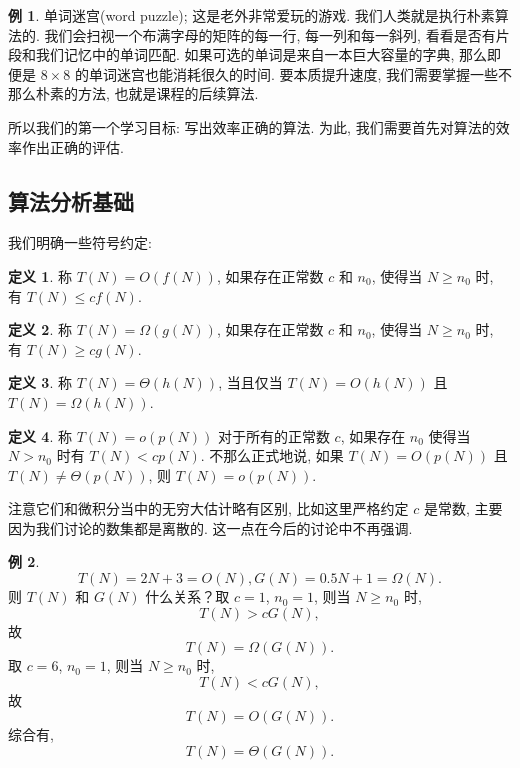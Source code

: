 \documentclass[a4paper]{ctexart}
\theoremstyle{definition}
\newtheorem{definition}{定义}[section]
\theoremstyle{definition}
\newtheorem{example}{例}[section]
\begin{document}
\begin{example}
单词迷宫(word puzzle); 这是老外非常爱玩的游戏. 我们人类就是执行朴素算法的.
我们会扫视一个布满字母的矩阵的每一行, 每一列和每一斜列, 看看是否有片段和我们记忆中的单词匹配.
如果可选的单词是来自一本巨大容量的字典, 那么即便是 $8 \times 8$ 的单词迷宫也能消耗很久的时间.
要本质提升速度, 我们需要掌握一些不那么朴素的方法, 也就是课程的后续算法.
\end{example}

所以我们的第一个学习目标: 写出效率正确的算法. 为此, 我们需要首先对算法的效率作出正确的评估. 

\subsection{算法分析基础}

我们明确一些符号约定:

\begin{definition}
  称 $T(N) = O(f(N))$, 如果存在正常数 $c$ 和 $n_0$,
  使得当 $N \geq n_0$ 时, 有 $T(N) \leq cf(N)$.
\end{definition}

\begin{definition}
  称 $T(N) = \Omega(g(N))$, 如果存在正常数 $c$ 和 $n_0$,
  使得当 $N \geq n_0$ 时, 有 $T(N) \geq cg(N)$.  
\end{definition}

\begin{definition}
称 $T(N) = \Theta(h(N))$, 当且仅当 $T(N) = O(h(N))$ 且 $T(N) = \Omega(h(N))$.  
\end{definition}

\begin{definition}
  称 $T(N) = o(p(N))$ 对于所有的正常数 $c$,
  如果存在 $n_0$ 使得当 $N > n_0$ 时有 $T(N) < cp(N)$.
  不那么正式地说, 如果 $T(N) = O(p(N))$ 且 $T(N) \neq \Theta(p(N))$,
  则 $T(N) = o(p(N))$.
\end{definition}

注意它们和微积分当中的无穷大估计略有区别, 比如这里严格约定 $c$ 是常数,
主要因为我们讨论的数集都是离散的. 这一点在今后的讨论中不再强调.

\begin{example}
  \[
  T(N) = 2N + 3 = O(N),
  G(N) = 0.5N + 1 = \Omega(N).
  \]
  则 $T(N)$ 和 $G(N)$ 什么关系？取 $c = 1$, $n_0 = 1$, 则当 $N \geq n_0$ 时,
  \[
  T(N) > cG(N),
  \]
  故 
  \[
  T(N) = \Omega(G(N)).
  \]
  取 $c = 6$, $n_0 = 1$, 则当 $N \geq n_0$ 时,
  \[
  T(N) < cG(N),
  \]
  故
  \[
  T(N) = O(G(N)).
  \]
  综合有,
  \[
  T(N) = \Theta(G(N)).
  \]
\end{example}
\end{document}
